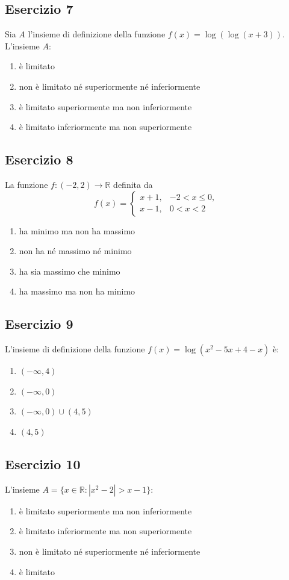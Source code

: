 \documentclass[12pt,a4paper]{article}
\begin{document}
\subsection*{Esercizio 7}
Sia $A$ l’insieme di definizione della funzione $f(x) = \log(\log(x + 3))$. L’insieme $A$:
\begin{enumerate}
  \item è limitato
  \item non è limitato né superiormente né inferiormente
  \item è limitato superiormente ma non inferiormente
  \item è limitato inferiormente ma non superiormente
\end{enumerate}

\subsection*{Esercizio 8}
La funzione $f : (-2,2) \to \mathbb{R}$ definita da
\[
f(x) = 
\begin{cases}
x + 1, & -2 < x \le 0,\\
x - 1, & 0 < x < 2
\end{cases}
\]
\begin{enumerate}
  \item ha minimo ma non ha massimo
  \item non ha né massimo né minimo
  \item ha sia massimo che minimo
  \item ha massimo ma non ha minimo
\end{enumerate}

\subsection*{Esercizio 9}
L’insieme di definizione della funzione $f(x) = \log(x^2 - 5x + 4 - x)$ è:
\begin{enumerate}
  \item $(-\infty, 4)$
  \item $(-\infty, 0)$
  \item $(-\infty, 0) \cup (4,5)$
  \item $(4,5)$
\end{enumerate}

\subsection*{Esercizio 10}
L’insieme $A = \{x \in \mathbb{R} : |x^2 - 2| > x - 1\}$:
\begin{enumerate}
  \item è limitato superiormente ma non inferiormente
  \item è limitato inferiormente ma non superiormente
  \item non è limitato né superiormente né inferiormente
  \item è limitato
\end{enumerate}
\end{document}
